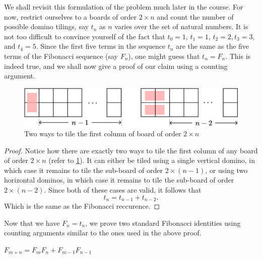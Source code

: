 We shall revisit this formulation of the problem much later in the course. For now, restrict ourselves to a boards of order $2\times n$ and count the number of possible domino tilings, say $t_{n}$ as $n$ varies over the set of natural numbers. It is not too difficult to convince yourself of the fact that $t_{0}=1$, $t_{1}=1$, $t_{2}=2, t_{3}=3$, and $t_{4}=5$. Since the first five terms in the sequence $t_{n}$ are the same as the five terms of the Fibonacci sequence (say $F_{n}$), one might guess that $t_{n} = F_{n}$. This is indeed true, and we shall now give a proof of our claim using a counting argument.
\begin{figure}[H]
	\centering
	\includegraphics[scale=0.6]{Images/Figure5.png}
	\caption{Two ways to tile the first column of board of order $2\times n$}
	\label{f:1.4}
\end{figure}
\begin{proof}
	Notice how there are exactly two ways to tile the first column of any board of order $2\times n$ (refer to \cref{f:1.4}). It can either be tiled using a single vertical domino, in which case it remains to tile the sub-board of order $2\times \left( n-1 \right)$, or using two horizontal dominos, in which case it remains to tile the sub-board of order $2\times \left( n-2 \right)$. Since both of these cases are valid, it follows that \[
t_{n}=t_{n-1}+t_{n-2}
.\] Which is the same as the Fibonacci reccurence.
\end{proof}

Now that we have $F_{n}=t_{n}$, we prove two standard Fibonacci identities using counting arguments similar to the ones used in the above proof.

\begin{claim}
$F_{m+n}=F_{m}F_{n} + F_{m-1}F_{n-1}$
\label{c:1.1}
\end{claim}

